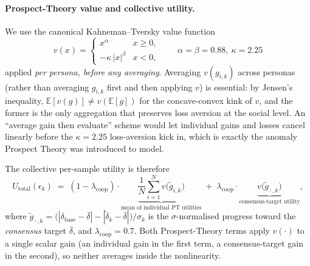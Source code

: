 \documentclass{article}
\begin{document}
\paragraph{Prospect-Theory value and collective utility.}
We use the canonical Kahneman--Tversky value function
\begin{equation}
  v(x) = \begin{cases}
    x^{\alpha} & x \geq 0,\\
    -\kappa\,|x|^{\beta} & x < 0,
  \end{cases}
  \qquad \alpha=\beta=0.88,\ \kappa=2.25
  \label{eq:prospect}
\end{equation}
applied \emph{per persona, before any averaging}. Averaging $v(g_{i,k})$
across personas (rather than averaging $g_{i,k}$ first and then applying $v$)
is essential: by Jensen's inequality, $\mathbb{E}[v(g)] \neq v(\mathbb{E}[g])$
for the concave-convex kink of $v$, and the former is the only aggregation that
preserves loss aversion at the social level. An ``average gain then evaluate''
scheme would let individual gains and losses cancel linearly before the
$\kappa{=}2.25$ loss-aversion kick in, which is exactly the anomaly Prospect
Theory was introduced to model.

The collective per-sample utility is therefore
\begin{equation}
  U_{\text{total}}(\epsilon_k)
  \;=\; (1-\lambda_{\text{coop}})\cdot\underbrace{\frac{1}{N}\sum_{i=1}^{N} v\!\bigl(\tilde{g}_{i,k}\bigr)}_{\text{mean of individual PT utilities}}
  \;+\; \lambda_{\text{coop}}\cdot\underbrace{v\!\bigl(\tilde{g}_{\bar{\cdot},k}\bigr)}_{\text{consensus-target utility}},
  \label{eq:util_total}
\end{equation}
where
$\tilde{g}_{\bar{\cdot},k} = \bigl(|\delta_{\text{base}}-\bar{\delta}| - |\tilde{\delta}_k-\bar{\delta}|\bigr)/\sigma_k$
is the $\sigma$-normalised progress toward the \emph{consensus} target
$\bar{\delta}$, and $\lambda_{\text{coop}}=0.7$. Both Prospect-Theory terms apply $v(\cdot)$ to a
single scalar gain (an individual gain in the first term, a consensus-target
gain in the second), so neither averages inside the nonlinearity.
\end{document}
